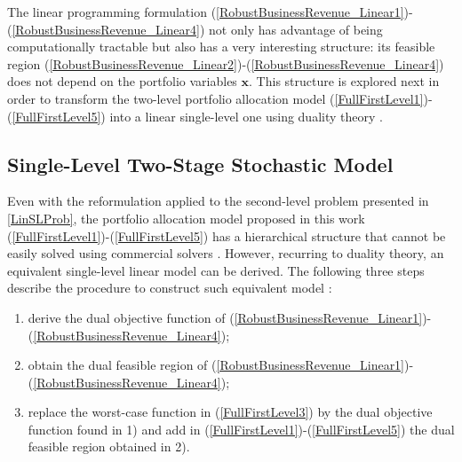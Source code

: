 	The linear programming formulation (\ref{RobustBusinessRevenue_Linear1})-(\ref{RobustBusinessRevenue_Linear4}) not only has advantage of being computationally tractable but also has a very interesting structure: its feasible region (\ref{RobustBusinessRevenue_Linear2})-(\ref{RobustBusinessRevenue_Linear4}) does not depend on the portfolio variables $\mathbf{x}$. This structure is explored next in order to transform the two-level portfolio allocation model (\ref{FullFirstLevel1})-(\ref{FullFirstLevel5}) into a linear single-level one using duality theory \cite{PriceOfRobustness}.

\subsection{Single-Level Two-Stage Stochastic Model}
\label{SL_TS_StochModel}

	Even with the reformulation applied to the second-level problem presented in \ref{LinSLProb}, the portfolio allocation model proposed in this work (\ref{FullFirstLevel1})-(\ref{FullFirstLevel5}) has a hierarchical structure that cannot be easily solved using commercial solvers \cite{Xpress}. However, recurring to duality theory, an equivalent single-level linear model can be derived. The following three steps describe the procedure to construct such equivalent model \cite{PriceOfRobustness}:
\begin{enumerate}
	\item derive the dual objective function of (\ref{RobustBusinessRevenue_Linear1})-(\ref{RobustBusinessRevenue_Linear4});
	\item obtain the dual feasible region  of (\ref{RobustBusinessRevenue_Linear1})-(\ref{RobustBusinessRevenue_Linear4});
	\item replace the worst-case function in (\ref{FullFirstLevel3}) by the dual objective function found in 1) and add in (\ref{FullFirstLevel1})-(\ref{FullFirstLevel5}) the dual feasible region obtained in 2).
\end{enumerate}
	
